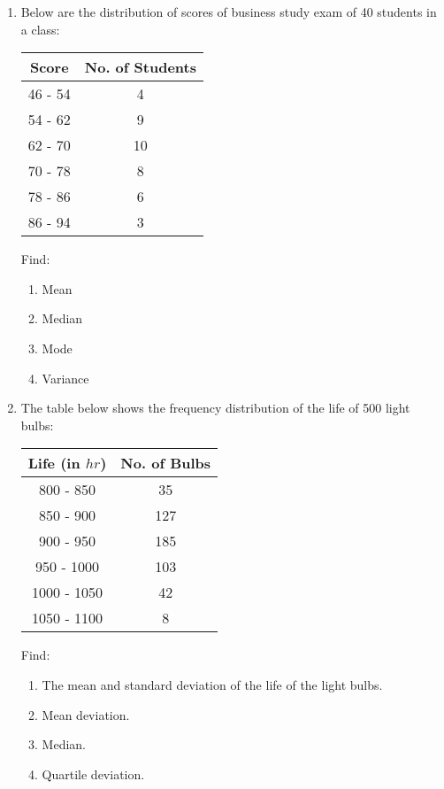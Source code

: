 \documentclass{report}
\begin{document}
\begin{multicols}{2}
\begin{enumerate}
    \item Below are the distribution of scores of business study exam of 40 students in a
          class:
          \begin{center}
            \begin{tabular}{|c|c|}
              \hline
              Score   & No. of Students \\
              \hline
              46 - 54 & 4               \\
              54 - 62 & 9               \\
              62 - 70 & 10              \\
              70 - 78 & 8               \\
              78 - 86 & 6               \\
              86 - 94 & 3               \\
              \hline
            \end{tabular}
          \end{center}
          Find:
          \begin{enumerate}
            \item Mean
            \item Median
            \item Mode
            \item Variance
          \end{enumerate}

    \item The table below shows the frequency distribution of the life of 500 light
          bulbs:
          \begin{center}
            \begin{tabular}{|c|c|}
              \hline
              Life (in $hr$) & No. of Bulbs \\
              \hline
              800 - 850      & 35           \\
              850 - 900      & 127          \\
              900 - 950      & 185          \\
              950 - 1000     & 103          \\
              1000 - 1050    & 42           \\
              1050 - 1100    & 8            \\
              \hline
            \end{tabular}
          \end{center}
          Find:
          \begin{enumerate}
            \item The mean and standard deviation of the life of the light bulbs.
            \item Mean deviation.
            \item Median.
            \item Quartile deviation.
          \end{enumerate}


\end{enumerate}
\end{multicols}
\end{document}

